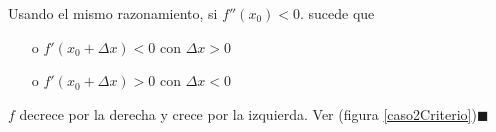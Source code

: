\documentclass[10pt,twoside]{SelfArx} %
\begin{document}
\begin{figure}[h]\label{casoCriterio}
	\centering
		\caption{}
\end{figure}
Usando el mismo     razonamiento, si $ f''(x_{0})<0 $.
    sucede que 
    \begin{enumerate}
    	\item[o] $ f'(x_{0}+\Delta x)<0 $ con $ \Delta x>0 $
    	\item[o] $ f'(x_{0}+\Delta x)>0 $ con $ \Delta x<0 $
    \end{enumerate}
    $ f $ decrece por la derecha y crece por la izquierda. Ver (figura \ref{caso2Criterio})$ \blacksquare $
\end{document}
